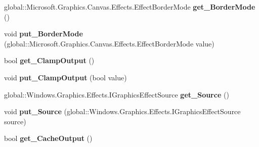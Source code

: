 \begin{DoxyCompactItemize}
global\+::\+Microsoft.\+Graphics.\+Canvas.\+Effects.\+Effect\+Border\+Mode {\bfseries get\+\_\+\+Border\+Mode} ()
\item 
\mbox{\label{class_microsoft_1_1_graphics_1_1_canvas_1_1_effects_1_1_convolve_matrix_effect_ace47dc75de05d5c68030464a1c59cada}} 
void {\bfseries put\+\_\+\+Border\+Mode} (global\+::\+Microsoft.\+Graphics.\+Canvas.\+Effects.\+Effect\+Border\+Mode value)
\item 
\mbox{\label{class_microsoft_1_1_graphics_1_1_canvas_1_1_effects_1_1_convolve_matrix_effect_a0f7dfb640c60f46c101101863ff9ee62}} 
bool {\bfseries get\+\_\+\+Clamp\+Output} ()
\item 
\mbox{\label{class_microsoft_1_1_graphics_1_1_canvas_1_1_effects_1_1_convolve_matrix_effect_a290fd5239a39bf63799d62e94e50f048}} 
void {\bfseries put\+\_\+\+Clamp\+Output} (bool value)
\item 
\mbox{\label{class_microsoft_1_1_graphics_1_1_canvas_1_1_effects_1_1_convolve_matrix_effect_a36fb9181bea0b36c84ceb83484bd971a}} 
global\+::\+Windows.\+Graphics.\+Effects.\+I\+Graphics\+Effect\+Source {\bfseries get\+\_\+\+Source} ()
\item 
\mbox{\label{class_microsoft_1_1_graphics_1_1_canvas_1_1_effects_1_1_convolve_matrix_effect_af05f022e107a04dda7a9dc92efa0fea7}} 
void {\bfseries put\+\_\+\+Source} (global\+::\+Windows.\+Graphics.\+Effects.\+I\+Graphics\+Effect\+Source source)
\item 
\mbox{\label{class_microsoft_1_1_graphics_1_1_canvas_1_1_effects_1_1_convolve_matrix_effect_a81775072112675498e5563529a8540f1}} 
bool {\bfseries get\+\_\+\+Cache\+Output} ()
\item 
\mbox{\label{class_microsoft_1_1_graphics_1_1_canvas_1_1_effects_1_1_convolve_matrix_effect_a66a0bf6663e75812433d1b1f3733ff5c}} 

\end{DoxyCompactItemize}
